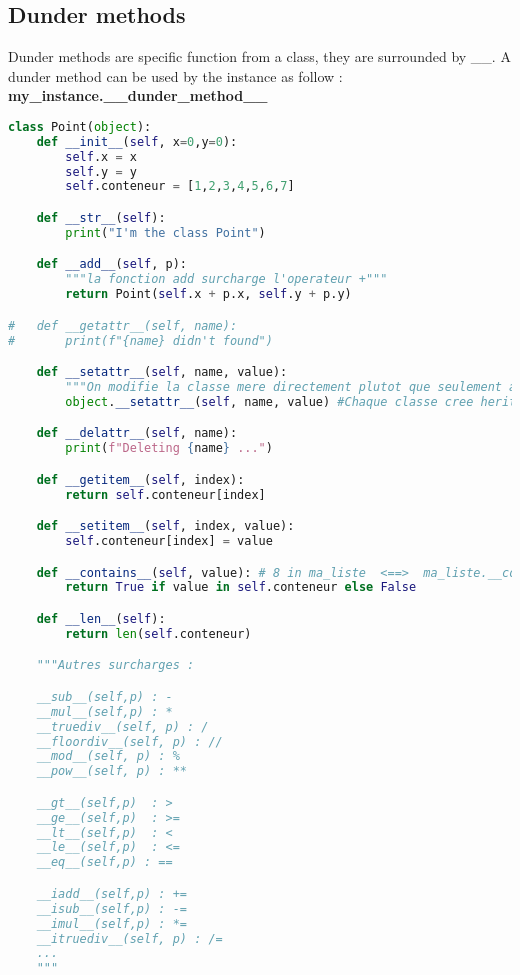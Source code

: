 \documentclass[a4paper, 12pt, titlepage]{scrartcl} %
\begin{document}
\subsection{Dunder methods}
Dunder methods are specific function from a class, they are surrounded by \_\_. A dunder method can be used by the instance as follow :\\ \textbf{my\_instance.\_\_dunder\_method\_\_}
\begin{lstlisting}[language=Python]
class Point(object):
	def __init__(self, x=0,y=0):
		self.x = x
		self.y = y
		self.conteneur = [1,2,3,4,5,6,7]

	def __str__(self):
		print("I'm the class Point")

	def __add__(self, p):
		"""la fonction add surcharge l'operateur +"""
		return Point(self.x + p.x, self.y + p.y)

#	def __getattr__(self, name):
#		print(f"{name} didn't found")

	def __setattr__(self, name, value):
		"""On modifie la classe mere directement plutot que seulement appeler setaatr de cette classe et tourner en boucle sur la meme methode"""
		object.__setattr__(self, name, value) #Chaque classe cree herite de base de la classe object

	def __delattr__(self, name):
		print(f"Deleting {name} ...")

	def __getitem__(self, index):
		return self.conteneur[index]

	def __setitem__(self, index, value):
		self.conteneur[index] = value

	def __contains__(self, value): # 8 in ma_liste  <==>  ma_liste.__contains__(8)
		return True if value in self.conteneur else False

	def __len__(self):
		return len(self.conteneur)

	"""Autres surcharges : 

	__sub__(self,p) : -
	__mul__(self,p) : *
	__truediv__(self, p) : /
	__floordiv__(self, p) : //
	__mod__(self, p) : %
	__pow__(self, p) : **

	__gt__(self,p)  : >
	__ge__(self,p) 	: >=
	__lt__(self,p)  : <
	__le__(self,p)  : <=
	__eq__(self,p) : == 

	__iadd__(self,p) : +=
	__isub__(self,p) : -=
	__imul__(self,p) : *=
	__itruediv__(self, p) : /=	
	...
	"""
\end{lstlisting}
\end{document}
